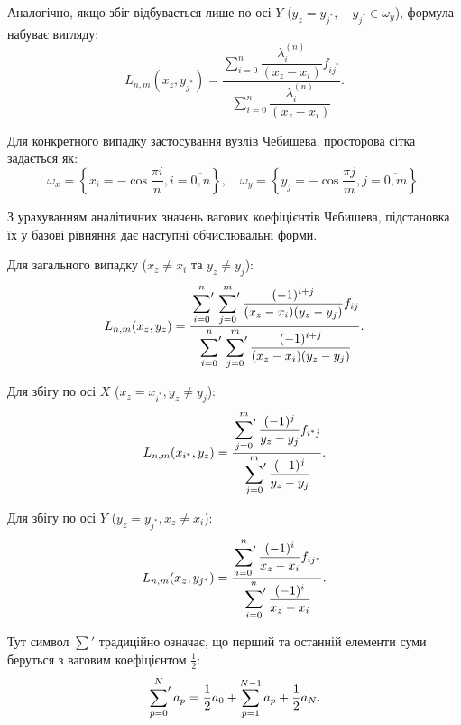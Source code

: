 Аналогічно, якщо збіг відбувається лише по осі $Y$ ($y_z = y_{j^*}, \quad y_{j^*} \in \omega_y$), формула набуває вигляду:
\begin{equation}\label{eq:barycentric_2d_y_exact}
	L_{n,m}(x_z, y_{j^*}) = \frac{\sum\limits_{i=0}^{n} \dfrac{\lambda_i^{(n)}}{(x_z - x_i)} f_{i j^*}}{\sum\limits_{i=0}^{n} \dfrac{\lambda_i^{(n)}}{(x_z - x_i)}}.
\end{equation}

Для конкретного випадку застосування вузлів Чебишева, просторова сітка задається як:
\begin{equation}\label{eq:cheb_nodes_2d}
	\omega_x = \left\{x_i = -\cos \frac{\pi i}{n}, i = \overline{0,n}\right\}, \quad \omega_y = \left\{y_j = -\cos \frac{\pi j}{m}, j = \overline{0,m}\right\}.
\end{equation}

З урахуванням аналітичних значень вагових коефіцієнтів Чебишева, підстановка їх у базові рівняння дає наступні обчислювальні форми.

Для загального випадку ($x_z \ne x_i$ та $y_z \ne y_j$):
\begin{equation}\label{eq:cheb_bary_2d_general}
	L_{n,m}(x_z, y_z) = \frac{\sideset{}{'}\sum\limits_{i=0}^{n} \sideset{}{'}\sum\limits_{j=0}^{m} \dfrac{(-1)^{i+j}}{(x_z-x_i)(y_z-y_j)} f_{ij}}{\sideset{}{'}\sum\limits_{i=0}^{n} \sideset{}{'}\sum\limits_{j=0}^{m} \dfrac{(-1)^{i+j}}{(x_z-x_i)(y_z-y_j)}}.
\end{equation}

Для збігу по осі $X$ ($x_z = x_{i^*}, y_z \ne y_j$):
\begin{equation}\label{eq:cheb_bary_2d_x_exact}
	L_{n,m}(x_{i^*}, y_z) = \frac{\sideset{}{'}\sum\limits_{j=0}^{m} \dfrac{(-1)^j}{y_z-y_j} f_{i^* j}}{\sideset{}{'}\sum\limits_{j=0}^{m} \dfrac{(-1)^j}{y_z-y_j}}.
\end{equation}

Для збігу по осі $Y$ ($y_z = y_{j^*}, x_z \ne x_i$):
\begin{equation}\label{eq:cheb_bary_2d_y_exact}
	L_{n,m}(x_z, y_{j^*}) = \frac{\sideset{}{'}\sum\limits_{i=0}^{n} \dfrac{(-1)^i}{x_z-x_i} f_{i j^*}}{\sideset{}{'}\sum\limits_{i=0}^{n} \dfrac{(-1)^i}{x_z-x_i}}.
\end{equation}

Тут символ $\sum'$ традиційно означає, що перший та останній елементи суми беруться з ваговим коефіцієнтом $\frac{1}{2}$:
\begin{equation*}
	\sideset{}{'}\sum\limits_{p=0}^{N} a_p = \frac{1}{2} a_0 + \sum\limits_{p=1}^{N-1} a_p + \frac{1}{2} a_N.
\end{equation*}